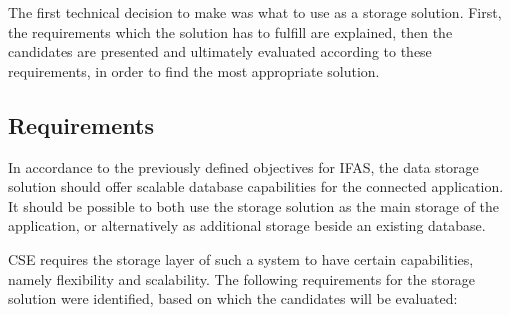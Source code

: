 The first technical decision to make was what to use as a storage solution.
First, the requirements which the solution has to fulfill are explained, then the candidates are presented and ultimately evaluated according to these requirements, in order to find the most appropriate solution.

\subsection{Requirements}
\label{subsec:classifications:storage:req}

In accordance to the previously defined objectives for \ac{IFAS}, the data storage solution should offer scalable database capabilities for the connected application.
It should be possible to both use the storage solution as the main storage of the application, or alternatively as additional storage beside an existing database.

\ac{CSE} requires the storage layer of such a system to have certain capabilities, namely flexibility and scalability.
The following requirements for the storage solution were identified, based on which the candidates will be evaluated:

